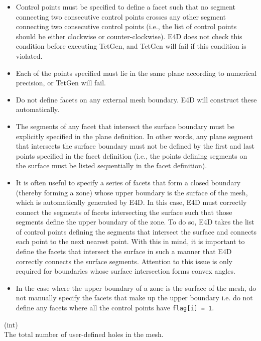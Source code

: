\documentclass[a4paper,12pt]{article}
\begin{document}
\begin{description}
    \begin{itemize}
        \item Control points must be specified to define a facet such that no segment connecting two consecutive control points crosses any other segment connecting two consecutive control points (i.e., the list of control points should be either clockwise or counter-clockwise). E4D does not check this condition before executing TetGen, and TetGen will fail if this condition is violated.
        \item Each of the points specified must lie in the same plane according to numerical precision, or TetGen will fail.
        \item Do not define facets on any external mesh boundary. E4D will construct these automatically.
        \item The segments of any facet that intersect the surface boundary must be explicitly specified in the plane definition. In other words, any plane segment that intersects the surface boundary must not be defined by the first and last points specified in the facet definition (i.e., the points defining segments on the surface must be listed sequentially in the facet definition).
        \item It is often useful to specify a series of facets that form a closed boundary (thereby forming a zone) whose upper boundary is the surface of the mesh, which is automatically generated by E4D. In this case, E4D must correctly connect the segments of facets intersecting the surface such that those segments define the upper boundary of the zone. To do so, E4D takes the list of control points defining the segments that intersect the surface and connects each point to the next nearest point. With this in mind, it is important to define the facets that intersect the surface in such a manner that E4D correctly connects the surface segments. Attention to this issue is only required for boundaries whose surface intersection forms convex angles.
        \item In the case where the upper boundary of a zone is the surface of the mesh, do not manually specify the facets that make up the upper boundary i.e. do not define any facets where all the control points have \texttt{flag[i] = 1}.
    \end{itemize}

    \item[\texttt{nh}] (int)\hfill \\
    The total number of user-defined holes in the mesh.


\end{description}
\end{document}
